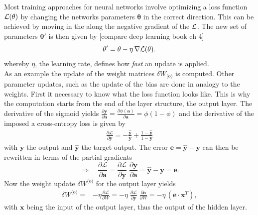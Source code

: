 Most training approaches for neural networks involve optimizing a loss function $\mathcal{L}(\mathbf{\theta})$ by changing the networks parameters $\mathbf{\theta}$ in the correct direction. This can be achieved by moving in the along the negative gradient of the $\mathcal{L}$. The new set of parameters $\mathbf{\theta'}$ is then given by [compare deep learning book ch 4]
\begin{equation}
\mathbf{\theta'} = \mathbf{\theta} - \eta \, \nabla\mathcal{L}(\mathbf{\theta}).
\end{equation}
whereby $\eta$, the learning rate, defines how \textit{fast} an update is applied.\\

As an example the update of the weight matrices $\delta W_{\text{(o)}}$ is computed. Other parameter updates, such as the update of the bias are done in analogy to the weights. First it necessary to know what the loss function looks like. This is why the computation starts from the end of the layer structure, the output layer. The derivative of the sigmoid yields $\frac{\partial \mathbf{y}}{\partial \mathbf{a}} = \frac{\partial \phi(\mathbf{a})}{\partial \mathbf{a}} = \phi (1 - \phi)$ and the derivative of the imposed a cross-entropy loss is given by
\begin{align}
\frac{\partial\mathcal{L}}{\partial \mathbf{y}} = 
- \frac{\hat{\mathbf{y}}}{\mathbf{y}} + 
\frac{1 - \hat{\mathbf{y}}}{1 - \mathbf{y}}
\end{align}
with $\mathbf{y}$ the output and $\hat{\mathbf{y}}$ the target output. The error $\mathbf{e} = \hat{\mathbf{y}} - \mathbf{y}$ can then be rewritten in terms of the partial gradients
\begin{equation}
\Rightarrow \quad \frac{\partial\mathcal{L}}{\partial \mathbf{a}} =
\frac{\partial\mathcal{L}}{\partial \mathbf{y}} 
\; \frac{\partial \mathbf{y}}{\partial \mathbf{a}} =
\hat{\mathbf{y}} - \mathbf{y} = \mathbf{e}.
\end{equation}
Now the weight update $\delta W^{\text{(o)}}$ for the output layer yields 
\begin{align}
\delta W^{\text{(o)}} =& - \eta \frac{\partial \mathcal{L}}{\partial W} 
= - \eta \;
\frac{\partial\mathcal{L}}{\partial \mathbf{y}} \;
\frac{\partial \mathbf{a}}{\partial W}
= - \eta \, (\mathbf{e} \cdot \mathbf{x}^T),
\end{align}
with $\mathbf{x}$ being the input of the output layer, thus the output of the hidden layer.

